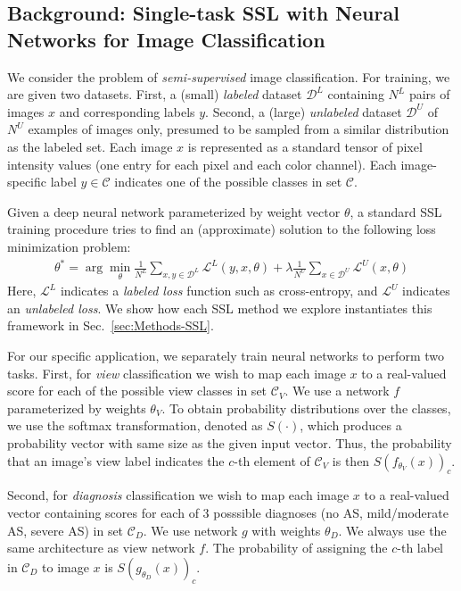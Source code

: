 \subsection{Background: Single-task SSL with Neural Networks for Image Classification}
\label{sec:ssl_background} 

We consider the problem of \emph{semi-supervised} image classification.
For training, we are given two datasets.
First, a (small) \emph{labeled} dataset $\mathcal{D}^L$ containing $N^L$ pairs of images $x$ and corresponding labels $y$.
Second, a (large) \emph{unlabeled} dataset $\mathcal{D}^U$ of $N^U$ examples of images only, presumed to be sampled from a similar distribution as the labeled set.
Each image $x$ is represented as a standard tensor of pixel intensity values (one entry for each pixel and each color channel).
Each image-specific label $y \in \mathcal{C}$ indicates one of the possible classes in set $\mathcal{C}$.

Given a deep neural network parameterized by weight vector $\theta$, a standard SSL training procedure tries to find an (approximate) solution to the following loss minimization problem:
\begin{align}
\theta^* = \arg\min_{\theta}
	\frac{1}{N^L}
	\sum_{x, y \in \mathcal{D}^L}
	\mathcal{L}^L(y, x, \theta) %
	+\lambda 
	\frac{1}{N^U}
	\sum_{x \in \mathcal{D}^U} \mathcal{L}^U( x, \theta )
\end{align}
\label{eq:standard-SSL-loss-template}
Here, $\mathcal{L}^L$ indicates a \emph{labeled loss} function such as cross-entropy, and $\mathcal{L}^U$ indicates an \emph{unlabeled loss}. We show how each SSL method we explore instantiates this framework in Sec.~\ref{sec:Methods-SSL}.

For our specific application, we separately train neural networks to perform two tasks.
First, for \emph{view} classification we wish to map each image $x$ to a real-valued score for each of the possible view classes in set $\mathcal{C}_V$.
We use a network $f$ parameterized by weights $\theta_V$.
To obtain probability distributions over the classes, we use the softmax transformation, denoted as $S(\cdot)$, which produces a probability vector with same size as the given input vector.
Thus, the probability that an image's view label indicates the $c$-th element of $\mathcal{C}_V$ is then $S( f_{\theta_V}(x) )_c$.

Second, for \emph{diagnosis} classification we wish to map each image $x$ to a real-valued vector containing scores for each of 3 posssible diagnoses (no AS, mild/moderate AS, severe AS) in set $\mathcal{C}_D$.
We use network $g$ with weights $\theta_D$. We always use the same architecture as view network $f$.
The probability of assigning the $c$-th label in $\mathcal{C}_D$ to image $x$ is $S( g_{\theta_D}(x) )_c$.

